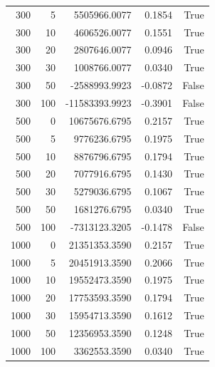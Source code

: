 \begin{tabular}{rrrrr}
300 & 5 & 5505966.0077 & 0.1854 & True \\
300 & 10 & 4606526.0077 & 0.1551 & True \\
300 & 20 & 2807646.0077 & 0.0946 & True \\
300 & 30 & 1008766.0077 & 0.0340 & True \\
300 & 50 & -2588993.9923 & -0.0872 & False \\
300 & 100 & -11583393.9923 & -0.3901 & False \\
500 & 0 & 10675676.6795 & 0.2157 & True \\
500 & 5 & 9776236.6795 & 0.1975 & True \\
500 & 10 & 8876796.6795 & 0.1794 & True \\
500 & 20 & 7077916.6795 & 0.1430 & True \\
500 & 30 & 5279036.6795 & 0.1067 & True \\
500 & 50 & 1681276.6795 & 0.0340 & True \\
500 & 100 & -7313123.3205 & -0.1478 & False \\
1000 & 0 & 21351353.3590 & 0.2157 & True \\
1000 & 5 & 20451913.3590 & 0.2066 & True \\
1000 & 10 & 19552473.3590 & 0.1975 & True \\
1000 & 20 & 17753593.3590 & 0.1794 & True \\
1000 & 30 & 15954713.3590 & 0.1612 & True \\
1000 & 50 & 12356953.3590 & 0.1248 & True \\
1000 & 100 & 3362553.3590 & 0.0340 & True \\
\bottomrule
\end{tabular}
